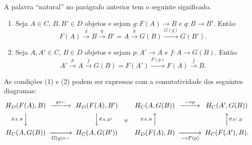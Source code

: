 \documentclass[12pt]{amsart}
\theoremstyle{definition}
\begin{document}
A palavra ``natural'' no parágrafo anterior tem o seguinte significado.
\begin{enumerate}
    \item Seja $A\in C$, $B,B'\in D$ objetos e sejam $g:F(A)\to B$ e $q:B\to B'$. Então
\[
    \overline{F(A)\xrightarrow{g} B\xrightarrow{q} B'}=A\xrightarrow{\bar g} G(B)\xrightarrow{G(q)} G(B').
\]
    \item Seja $A,A'\in C$, $B\in D$ objetos e sejam $p:A'\to A$ e $f:A\to G(B)$. Então
\[
    \overline{A'\xrightarrow{p} A\xrightarrow{f} G(B)}=F(A')\xrightarrow{F(p)} F(A)\xrightarrow{\bar f} B.
\]
\end{enumerate} 
As condições (1) e (2) podem ser expressas com a comutatividade dos seguintes diagramas:
\[
\begin{CD}
    H_D(F(A),B) @>{q\circ-}>> H_D(F(A),B')\\
    @V{\varrho_{A,B}}VV @VV{\varrho_{A,B'}}V\\
    H_C(A,G(B) ) @>>{G(q)\circ -}>H_C(A,G(B'))
\end{CD}\quad
\mbox{e}
\quad
\begin{CD}
    H_C(A,G(B)) @>{-\circ p}>> H_C(A',G(B))\\
    @A{\varrho_{A,B}}AA @AA{\varrho_{A',B}}A\\
    H_D(F(A),B ) @>>{-\circ F(p)}>H_C(F(A'),B).
\end{CD}
\]
\end{document}
